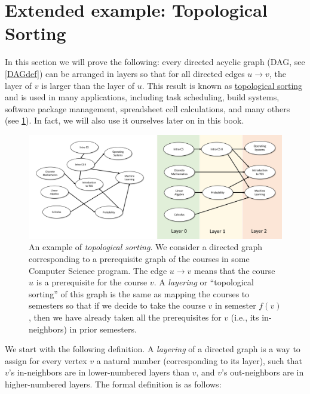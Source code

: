 \section{Extended example: Topological Sorting}\label{topsortsec}

In this section we will prove the following: every directed acyclic
graph (DAG, see \cref{DAGdef}) can be arranged in layers so that for all
directed edges \(u \rightarrow v\), the layer of \(v\) is larger than
the layer of \(u\). This result is known as
\href{https://goo.gl/QUskBc}{topological sorting} and is used in many
applications, including task scheduling, build systems, software package
management, spreadsheet cell calculations, and many others (see
\cref{topologicalsortfig}). In fact, we will also use it ourselves later
on in this book.


\begin{figure}
\centering
\includegraphics[width=\textwidth, height=0.25\paperheight, keepaspectratio]{../figure/topologicalsort.png}
\caption{An example of \emph{topological sorting}. We consider a
directed graph corresponding to a prerequisite graph of the courses in
some Computer Science program. The edge \(u \rightarrow v\) means that
the course \(u\) is a prerequisite for the course \(v\). A
\emph{layering} or ``topological sorting'' of this graph is the same as
mapping the courses to semesters so that if we decide to take the course
\(v\) in semester \(f(v)\), then we have already taken all the
prerequisites for \(v\) (i.e., its in-neighbors) in prior semesters.}
\label{topologicalsortfig}
\end{figure}

We start with the following definition. A \emph{layering} of a directed
graph is a way to assign for every vertex \(v\) a natural number
(corresponding to its layer), such that \(v\)'s in-neighbors are in
lower-numbered layers than \(v\), and \(v\)'s out-neighbors are in
higher-numbered layers. The formal definition is as follows:

